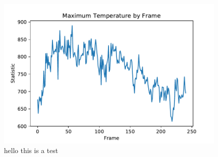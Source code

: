 \documentclass{article}
\begin{document}
\begin{figure}
\includegraphics{../plots/f1_maxtemp.pdf}
\caption{hello this is a test}

\end{figure}
\end{document}
